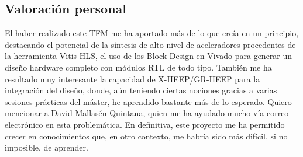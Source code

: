 \subsection{Valoración personal}
El haber realizado este \ac{TFM} me ha aportado más de lo que creía en un principio, destacando el potencial de la síntesis de alto nivel de aceleradores procedentes de la herramienta Vitis HLS, el uso de los Block Design en Vivado para generar un diseño hardware completo con módulos RTL de todo tipo. También me ha resultado muy interesante la capacidad de X-HEEP/GR-HEEP para la integración del diseño, donde, aún teniendo ciertas nociones gracias a varias sesiones prácticas del máster, he aprendido bastante más de lo esperado. Quiero mencionar a David Mallasén Quintana, quien me ha ayudado mucho vía correo electrónico en esta problemática. En definitiva, este proyecto me ha permitido crecer en conocimientos que, en otro contexto, me habría sido más difícil, si no imposible, de aprender.
